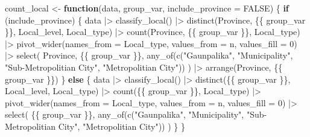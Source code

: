 \documentclass[
  letterpaper,
  DIV=11,
  numbers=noendperiod]{scrartcl}
\newenvironment{Shaded}{\begin{snugshade}}{\end{snugshade}}
\newcommand{\AttributeTok}[1]{\textcolor[rgb]{0.40,0.45,0.13}{#1}}
\newcommand{\ConstantTok}[1]{\textcolor[rgb]{0.56,0.35,0.01}{#1}}
\newcommand{\ControlFlowTok}[1]{\textcolor[rgb]{0.00,0.23,0.31}{\textbf{#1}}}
\newcommand{\DecValTok}[1]{\textcolor[rgb]{0.68,0.00,0.00}{#1}}
\newcommand{\FunctionTok}[1]{\textcolor[rgb]{0.28,0.35,0.67}{#1}}
\newcommand{\NormalTok}[1]{\textcolor[rgb]{0.00,0.23,0.31}{#1}}
\newcommand{\OtherTok}[1]{\textcolor[rgb]{0.00,0.23,0.31}{#1}}
\newcommand{\SpecialCharTok}[1]{\textcolor[rgb]{0.37,0.37,0.37}{#1}}
\newcommand{\StringTok}[1]{\textcolor[rgb]{0.13,0.47,0.30}{#1}}
\begin{document}
\begin{Shaded}
\begin{Highlighting}[]
\NormalTok{count\_local }\OtherTok{\textless{}{-}} \ControlFlowTok{function}\NormalTok{(data, group\_var, }\AttributeTok{include\_province =} \ConstantTok{FALSE}\NormalTok{) \{}
  \ControlFlowTok{if}\NormalTok{ (include\_province) \{}
\NormalTok{    data }\SpecialCharTok{|\textgreater{}}
      \FunctionTok{classify\_local}\NormalTok{() }\SpecialCharTok{|\textgreater{}}
      \FunctionTok{distinct}\NormalTok{(Province, \{\{ group\_var \}\}, Local\_level, Local\_type) }\SpecialCharTok{|\textgreater{}}
      \FunctionTok{count}\NormalTok{(Province, \{\{ group\_var \}\}, Local\_type) }\SpecialCharTok{|\textgreater{}}
      \FunctionTok{pivot\_wider}\NormalTok{(}\AttributeTok{names\_from =}\NormalTok{ Local\_type, }\AttributeTok{values\_from =}\NormalTok{ n, }\AttributeTok{values\_fill =} \DecValTok{0}\NormalTok{) }\SpecialCharTok{|\textgreater{}}
      \FunctionTok{select}\NormalTok{(}
\NormalTok{        Province, \{\{ group\_var \}\},}
        \FunctionTok{any\_of}\NormalTok{(}\FunctionTok{c}\NormalTok{(}\StringTok{"Gaunpalika"}\NormalTok{, }\StringTok{"Municipality"}\NormalTok{, }\StringTok{"Sub{-}Metropolitian City"}\NormalTok{, }\StringTok{"Metropolitian City"}\NormalTok{))}
\NormalTok{      ) }\SpecialCharTok{|\textgreater{}}
      \FunctionTok{arrange}\NormalTok{(Province, \{\{ group\_var \}\})}
\NormalTok{  \} }\ControlFlowTok{else}\NormalTok{ \{}
\NormalTok{    data }\SpecialCharTok{|\textgreater{}}
      \FunctionTok{classify\_local}\NormalTok{() }\SpecialCharTok{|\textgreater{}}
      \FunctionTok{distinct}\NormalTok{(\{\{ group\_var \}\}, Local\_level, Local\_type) }\SpecialCharTok{|\textgreater{}}
      \FunctionTok{count}\NormalTok{(\{\{ group\_var \}\}, Local\_type) }\SpecialCharTok{|\textgreater{}}
      \FunctionTok{pivot\_wider}\NormalTok{(}\AttributeTok{names\_from =}\NormalTok{ Local\_type, }\AttributeTok{values\_from =}\NormalTok{ n, }\AttributeTok{values\_fill =} \DecValTok{0}\NormalTok{) }\SpecialCharTok{|\textgreater{}}
      \FunctionTok{select}\NormalTok{(}
\NormalTok{        \{\{ group\_var \}\},}
        \FunctionTok{any\_of}\NormalTok{(}\FunctionTok{c}\NormalTok{(}\StringTok{"Gaunpalika"}\NormalTok{, }\StringTok{"Municipality"}\NormalTok{, }\StringTok{"Sub{-}Metropolitian City"}\NormalTok{, }\StringTok{"Metropolitian City"}\NormalTok{))}
\NormalTok{      )}
\NormalTok{  \}}
\NormalTok{\}}


\end{Highlighting}
\end{Shaded}
\end{document}
